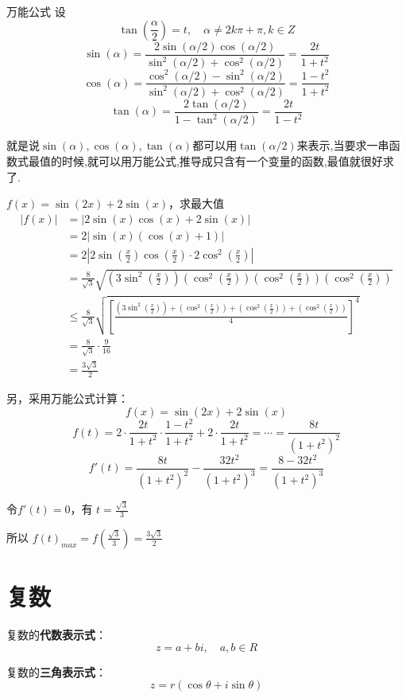 \documentclass[12pt]{article}
\begin{document}
万能公式
设
$$
\tan(\frac{\alpha}{2}) = t, \quad \alpha \neq 2k\pi + \pi, k \in Z
$$
$$
\sin(\alpha) 
= \frac{2\sin(\alpha/2)\cos(\alpha/2)}{\sin^2(\alpha/2) + \cos^2(\alpha/2)} 
= \frac{2t}{1+t^2} 
$$
$$
\cos(\alpha) 
= \frac{\cos^2(\alpha/2) - \sin^2(\alpha/2)}{\sin^2(\alpha/2) + \cos^2(\alpha/2)} 
= \frac{1-t^2}{1+t^2} 
$$
$$
\tan(\alpha) = \frac{2\tan(\alpha/2)}{1 - \tan^2(\alpha/2)} = \frac{2t}{1-t^2}
$$

就是说$\sin(\alpha),\cos(\alpha),\tan(\alpha)$都可以用$\tan(\alpha/2)$来表示,当要求一串函数式最值的时候,就可以用万能公式,推导成只含有一个变量的函数,最值就很好求了.

\begin{framed}  
\small{
$f(x) = \sin(2x) + 2\sin(x)$，求最大值
\begin{align*}
|f(x)| &= |2\sin(x)\cos(x) + 2\sin(x)| \\
    &= 2|\sin(x)(\cos(x) + 1)| \\
    &= 2|2\sin(\frac{x}{2})\cos(\frac{x}{2})\cdot 2\cos^2(\frac{x}{2})| \\
    &= \frac{8}{\sqrt{3}}\sqrt{(3\sin^2(\frac{x}{2}))(\cos^2(\frac{x}{2}))(\cos^2(\frac{x}{2}))(\cos^2(\frac{x}{2}))} \\
    &\le \frac{8}{\sqrt{3}}\sqrt{[\frac{(3\sin^2(\frac{x}{2})) + (\cos^2(\frac{x}{2})) + (\cos^2(\frac{x}{2})) + (\cos^2(\frac{x}{2}))}{4}]^4} \\
    &= \frac{8}{\sqrt{3}}\cdot \frac{9}{16} \\
    &= \frac{3\sqrt{3}}{2} 
\end{align*}

另，采用万能公式计算：
$$
f(x) = \sin(2x) + 2\sin(x)
$$
$$
f(t) = 2\cdot\frac{2t}{1+t^2}\cdot\frac{1-t^2}{1+t^2} + 2\cdot\frac{2t}{1+t^2} = \cdots = \frac{8t}{(1+t^2)^2}
$$
$$
f'(t) = \frac{8t}{(1+t^2)^2} - \frac{32t^2}{(1+t^2)^3} = \frac{8-32t^2}{(1+t^2)^3}
$$

令$f'(t) = 0$，有 $t = \frac{\sqrt{3}}{3}$

所以 $f(t)_{max} = f(\frac{\sqrt{3}}{3}) = \frac{3\sqrt{3}}{2}$
}
\end{framed}

\section{复数}
复数的\textbf{代数表示式}：
$$
z = a + bi, \quad a,b \in R
$$

复数的\textbf{三角表示式}：
$$
z = r(\cos\theta + i\sin\theta)
$$
\end{document}

